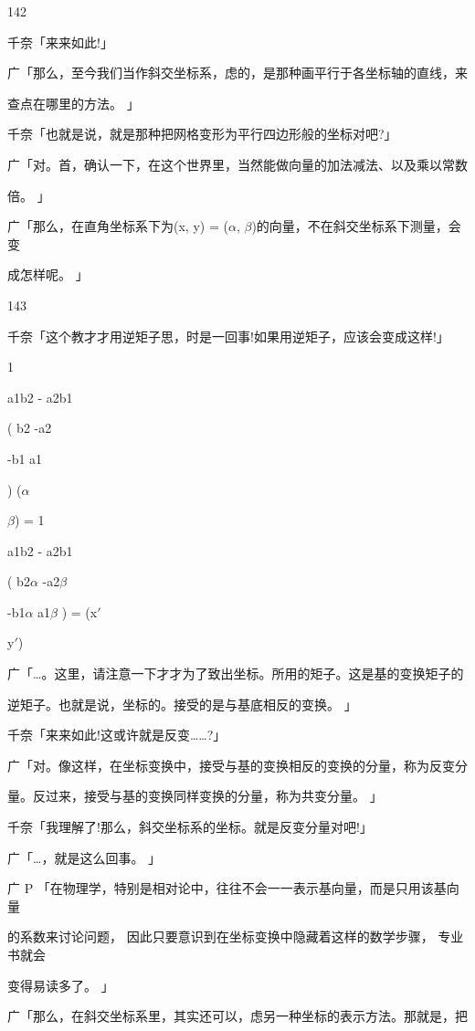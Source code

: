 142\par
千奈「来来如此!」\par
广「那么，至今我们当作斜交坐标系，虑的，是那种画平行于各坐标轴的直线，来\par
查点在哪里的方法。 」\par
千奈「也就是说，就是那种把网格变形为平行四边形般的坐标对吧?」\par
广「对。首，确认一下，在这个世界里，当然能做向量的加法减法、以及乘以常数\par
倍。 」\par
广「那么，在直角坐标系下为(x, y) = ($\alpha$, $\beta$)的向量，不在斜交坐标系下测量，会变\par
成怎样呢。 」\par

143\par
千奈「这个教才才用逆矩子思，时是一回事!如果用逆矩子，应该会变成这样!」\par
1\par
a1b2 - a2b1\par
( b2 -a2\par
-b1 a1\par
) ($\alpha$\par
$\beta$) = 1\par
a1b2 - a2b1\par
( b2$\alpha$ -a2$\beta$\par
-b1$\alpha$ a1$\beta$ ) = (x$\prime$\par
y$\prime$)\par
广「…。这里，请注意一下才才为了致出坐标。所用的矩子。这是基的变换矩子的\par
逆矩子。也就是说，坐标的。接受的是与基底相反的变换。 」\par
千奈「来来如此!这或许就是反变……?」\par
广「对。像这样，在坐标变换中，接受与基的变换相反的变换的分量，称为反变分\par
量。反过来，接受与基的变换同样变换的分量，称为共变分量。 」\par
千奈「我理解了!那么，斜交坐标系的坐标。就是反变分量对吧!」\par
广「…，就是这么回事。 」\par
广 P 「在物理学，特别是相对论中，往往不会一一表示基向量，而是只用该基向量\par
的系数来讨论问题， 因此只要意识到在坐标变换中隐藏着这样的数学步骤， 专业书就会\par
变得易读多了。 」\par
广「那么，在斜交坐标系里，其实还可以，虑另一种坐标的表示方法。那就是，把\par
